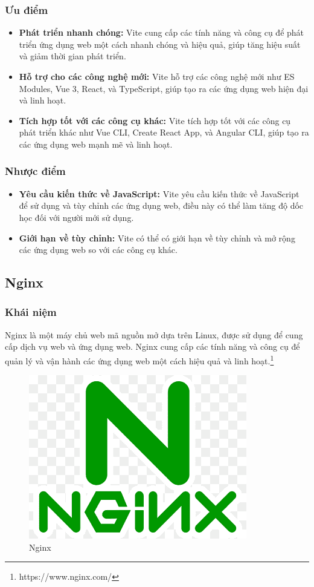 \subsubsection{Ưu điểm}
\begin{itemize}
  \item \textbf{Phát triển nhanh chóng:} Vite cung cấp các tính năng và công cụ để phát triển ứng dụng web một cách nhanh chóng và hiệu quả, giúp tăng hiệu suất và giảm thời gian phát triển.
  \item \textbf{Hỗ trợ cho các công nghệ mới:} Vite hỗ trợ các công nghệ mới như ES Modules, Vue 3, React, và TypeScript, giúp tạo ra các ứng dụng web hiện đại và linh hoạt.
  \item \textbf{Tích hợp tốt với các công cụ khác:} Vite tích hợp tốt với các công cụ phát triển khác như Vue CLI, Create React App, và Angular CLI, giúp tạo ra các ứng dụng web mạnh mẽ và linh hoạt.
\end{itemize}
\subsubsection{Nhược điểm}
\begin{itemize}
  \item \textbf{Yêu cầu kiến thức về JavaScript:} Vite yêu cầu kiến thức về JavaScript để sử dụng và tùy chỉnh các ứng dụng web, điều này có thể làm tăng độ dốc học đối với người mới sử dụng.
  \item \textbf{Giới hạn về tùy chỉnh:} Vite có thể có giới hạn về tùy chỉnh và mở rộng các ứng dụng web so với các công cụ khác.
\end{itemize}
\subsection{Nginx}
\subsubsection{Khái niệm}
\noindent Nginx là một máy chủ web mã nguồn mở dựa trên Linux, được sử dụng để cung cấp dịch vụ web và ứng dụng web. Nginx cung cấp các tính năng và công cụ để quản lý và vận hành các ứng dụng web một cách hiệu quả và linh hoạt.\footnote{https://www.nginx.com/}
\begin{figure}[H]
  \begin{center}
    \includegraphics[scale=0.4]{images/hieu/phuluc/nginx.png}
    \caption{Nginx}
  \end{center}
\end{figure}
